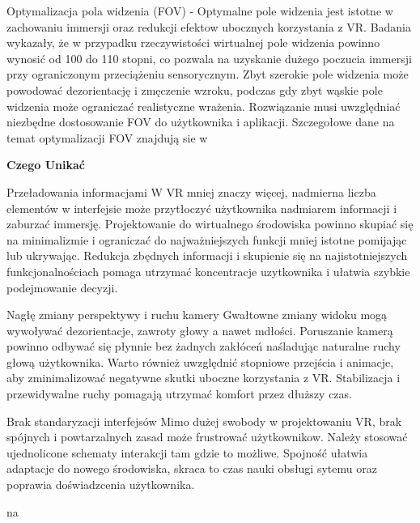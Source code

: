 Optymalizacja pola widzenia (FOV) - Optymalne pole widzenia jest istotne w zachowaniu immersji oraz redukcji efektow ubocznych korzystania z VR. Badania wykazały, że w przypadku rzeczywistości wirtualnej pole widzenia powinno wynosić od 100 do 110 stopni, co pozwala na uzyskanie dużego poczucia immersji przy ograniczonym przeciążeniu sensorycznym. Zbyt szerokie pole widzenia może powodować dezorientację i zmęczenie wzroku, podczas gdy zbyt wąskie pole widzenia może ograniczać realistyczne wrażenia. Rozwiązanie musi uwzględniać niezbędne dostosowanie FOV do użytkownika i aplikacji. Szczegołowe dane na temat optymalizacji FOV znajdują sie w %




\textbf{Czego Unikać}

Przeładowania informacjami
W VR mniej znaczy więcej, nadmierna liczba elementów w interfejsie może przytłoczyć użytkownika nadmiarem informacji i zaburzać immersję. Projektowanie do wirtualnego środowiska powinno skupiać się na minimalizmie i ograniczać do najważniejszych funkcji mniej istotne pomijając lub ukrywając. Redukcja zbędnych informacji i skupienie się na najistotniejszych funkcjonalnościach pomaga utrzymać koncentracje uzytkownika i ułatwia szybkie podejmowanie decyzji.

Nagłę zmiany perspektywy i ruchu kamery
Gwałtowne zmiany widoku mogą wywoływać dezorientacje, zawroty głowy a nawet mdłości. Poruszanie kamerą powinno odbywać się płynnie bez żadnych zakłóceń  naśladując naturalne ruchy głową użytkownika. Warto również uwzględnić stopniowe przejścia i animacje, aby zminimalizować negatywne skutki uboczne korzystania z VR. Stabilizacja i przewidywalne ruchy pomagają utrzymać komfort przez dłuższy czas. 

Brak standaryzacji interfejsów
Mimo dużej swobody w projektowaniu VR, brak spójnych i powtarzalnych zasad może frustrować użytkownikow. Należy stosować ujednolicone schematy interakcji tam gdzie to możliwe. Spojność ułatwia adaptacje do nowego środowiska, skraca to czas nauki obsługi sytemu oraz poprawia doświadzcenia użytkownika. 



na

